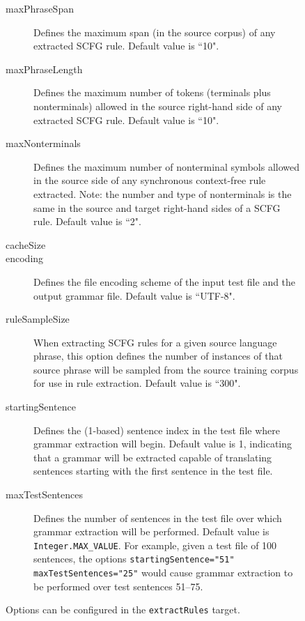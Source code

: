 \documentclass{pbml}
\begin{document}
\begin{figure}
\begin{description}

	\item[maxPhraseSpan] Defines the maximum span (in the source corpus) of any extracted SCFG rule. Default value is ``10".

	\item[maxPhraseLength] Defines the maximum number of tokens (terminals plus nonterminals) allowed in the source right-hand side of any extracted SCFG rule. Default value is ``10".

	\item[maxNonterminals] Defines the maximum number of nonterminal symbols allowed in the source side of any synchronous context-free rule extracted. Note: the number and type of nonterminals is the same in the source and target right-hand sides of a SCFG rule. Default value is ``2".

	\item[cacheSize]

	\item[encoding] Defines the file encoding scheme of the input test file and the output grammar file. Default value is ``UTF-8".


	\item[ruleSampleSize] When extracting SCFG rules for a given source language phrase, this option defines the number of instances of that source phrase will be sampled from the source training corpus for use in rule extraction. Default value is ``300".
	
	\item[startingSentence] Defines the (1-based) sentence index in the test file where grammar extraction will begin. Default value is 1, indicating that a grammar will be extracted capable of translating sentences starting with the first sentence in the test file.

	\item[maxTestSentences] Defines the number of sentences in the test file over which grammar extraction will be performed. Default value is {\tt Integer.MAX\_VALUE}. For example, given a test file of 100 sentences, the options {\tt startingSentence="51"  maxTestSentences="25"} would cause grammar extraction to be performed over test sentences 51--75.

\end{description}
\caption{Options can be configured in the {\tt extractRules} target.}
\end{figure}
\end{document}
